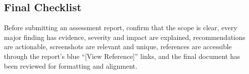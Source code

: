 \documentclass[11pt,a4paper]{article}
\begin{document}
\subsection{Final Checklist}
Before submitting an assessment report, confirm that the scope is clear, every major finding has evidence, severity and impact are explained, recommendations are actionable, screenshots are relevant and unique, references are accessible through the report's blue ``[View Reference]'' links, and the final document has been reviewed for formatting and alignment.
\end{document}
